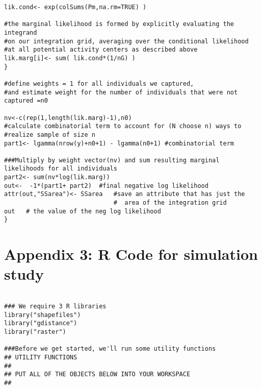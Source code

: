 \documentclass[12pt]{article}
\begin{document}
\begin{spacing}{1.2}
{\begin{verbatim}
lik.cond<- exp(colSums(Pm,na.rm=TRUE) )

#the marginal likelihood is formed by explicitly evaluating the integrand 
#on our integration grid, averaging over the conditional likelihood 
#at all potential activity centers as described above
lik.marg[i]<- sum( lik.cond*(1/nG) )  
}      

#define weights = 1 for all individuals we captured, 
#and estimate weight for the number of individuals that were not captured =n0                 
                     
nv<-c(rep(1,length(lik.marg)-1),n0)  
#calculate combinatorial term to account for (N choose n) ways to  
#realize sample of size n
part1<- lgamma(nrow(y)+n0+1) - lgamma(n0+1) #combinatorial term  

###Multiply by weight vector(nv) and sum resulting marginal likelihoods for all individuals
part2<- sum(nv*log(lik.marg))  
out<-  -1*(part1+ part2)  #final negative log likelihood
attr(out,"SSarea")<- SSarea   #save an attribute that has just the
                              #  area of the integration grid
out   # the value of the neg log likelihood
}
\end{verbatim}
}



\newpage

\section*{Appendix 3: {\bf R} Code for simulation study }

{\tiny
\begin{verbatim}

### We require 3 R libraries
library("shapefiles")
library("gdistance")
library("raster")

###Before we get started, we'll run some utility functions 
## UTILITY FUNCTIONS 
## 
## PUT ALL OF THE OBJECTS BELOW INTO YOUR WORKSPACE
##


\end{verbatim}}
\end{spacing}
\end{document}
